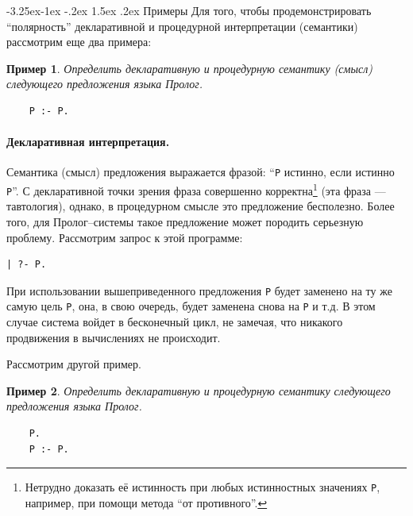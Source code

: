 \documentclass[12pt, openany, twoside]{book} %
\makeatletter
\newtheorem{example}{Пример}[chapter]
\renewcommand\subsubsection{\@startsection{subsubsection}{3}{\z@}%
                                     {-3.25ex\@plus -1ex \@minus -.2ex}%
                                     {1.5ex \@plus .2ex}%
                                     {\normalfont\normalsize\bfseries}}
\makeatother
\begin{document}
\subsubsection{Примеры}
Для того, чтобы продемонстрировать ``полярность'' декларативной и процедурной интерпретации (семантики) рассмотрим еще два примера:

\begin{example}
Определить декларативную и процедурную семантику (смысл) следующего предложения языка Пролог.
\end{example}
{\tt\begin{verbatim}
    P :- P.
\end{verbatim}}

\paragraph{Декларативная интерпретация.}
\noindent Семантика (смысл) предложения выражается фразой: ``{\tt P} истинно, если истинно {\tt P}''. С декларативной точки зрения фраза совершенно корректна\footnote{Нетрудно доказать её истинность при любых истинностных значениях {\tt P}, например, при помощи метода ``от противного''.} (эта фраза --- тавтология),  однако, в процедурном смысле это предложение бесполезно. Более того, для Пролог--системы такое предложение может породить серьезную проблему. Рассмотрим запрос к этой программе:
{\tt\begin{verbatim}
| ?- P.
\end{verbatim}}
\noindent При использовании вышеприведенного предложения {\tt P} будет заменено на ту же самую цель {\tt P}, она, в свою очередь, будет заменена снова на {\tt P} и т.д. В этом случае система войдет в бесконечный цикл, не замечая, что никакого продвижения в вычислениях не происходит.

Рассмотрим другой пример.
\begin{example}
Определить декларативную и процедурную семантику следующего предложения языка Пролог.
\end{example}
{\tt\begin{verbatim}
    P.
    P :- P.
\end{verbatim}}
\end{document}
